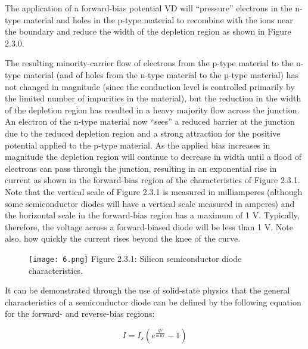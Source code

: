 \documentclass[10pt,a4paper]{article}
\begin{document}
The application of a forward-bias potential VD will “pressure” electrons in the n-type material and holes in the p-type material to recombine with the ions near the boundary and reduce the width of the depletion region as shown in Figure 2.3.0. 

\begin{multicols}{2}
The resulting minority-carrier flow of electrons from the p-type material to the n-type material (and of holes from the n-type material to the p-type material) has not changed in magnitude (since the conduction level is controlled primarily by the limited number of impurities in the material), but the reduction in the width of the depletion region has resulted in a heavy majority flow across the junction. An electron of the n-type material now “sees” a reduced barrier at the junction due to the reduced depletion region and a strong attraction for the positive potential applied to the p-type material. As the applied bias increases in magnitude the depletion region will continue to decrease in width until a flood of electrons can pass through the junction, resulting in an exponential rise in current as shown in the forward-bias region of the characteristics of Figure 2.3.1. Note that the vertical scale of Figure 2.3.1 is measured in milliamperes (although some semiconductor diodes will have a vertical scale measured in amperes) and the horizontal scale in the forward-bias region has a maximum of 1 V. Typically, therefore, the voltage across a forward-biased diode will be less than 1 V. Note also, how quickly the current rises beyond the knee of the curve. \linebreak \linebreak

\begin{figure}[H]
\texttt{[image: 6.png]}
\centering \linebreak \linebreak Figure 2.3.1: Silicon semiconductor diode characteristics.
\end{figure}
\end{multicols}

It can be demonstrated through the use of solid-state physics that the general characteristics of a semiconductor diode can be defined by the following equation for the forward- and reverse-bias regions:

\textbf{\textit{\Large {
\begin{equation}
I = I_{s} ( e^\frac{qV}{mKt} - 1 ) 
\end{equation}
}}}
\end{document}
